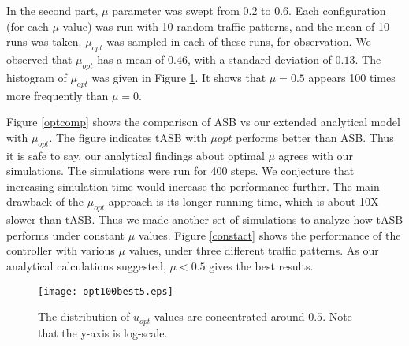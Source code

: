 \documentclass[conference]{IEEEtran}
\begin{document}
 
In the second part, $\mu$ parameter was swept from $0.2$ to $0.6$.
Each configuration (for each $\mu$ value) was run with 10 random traffic patterns, and  the mean of 10 runs was taken. 
 $\mu_{opt}$ was sampled in each of these runs, for observation. 
We observed that $\mu_{opt}$ has a mean of $0.46$, with a standard deviation of $0.13$. 
The histogram of  $\mu_{opt}$ was given in Figure \ref{opthist}. 
It shows that $\mu=0.5$ appears 100 times more frequently than $\mu=0$.


Figure \ref{optcomp} shows the comparison of ASB vs our extended analytical model with $\mu_{opt}$.
The figure indicates tASB with $\mu{opt}$ performs better than ASB.
Thus it is safe to say, our analytical findings about optimal $\mu$ agrees with our simulations.
The simulations were run for 400 steps. We conjecture that increasing simulation time would  increase the performance further.
The main drawback of the $\mu_{opt}$ approach is its longer running time, which is about 10X slower than  tASB.
Thus we made another set of simulations to analyze how tASB performs under constant $\mu$ values.
  Figure \ref{constact} shows the performance of the controller with various $\mu$ values, under 
three different traffic patterns. As our analytical calculations suggested, $\mu < 0.5$ gives the best results. 

 \begin{figure}[hb] 
 \centering
   \texttt{[image: opt100best5.eps]}
\caption{The distribution of $u_{opt}$ values are concentrated around $0.5$.
 Note that the y-axis is log-scale.
 }
\label{opthist}
\end{figure}
\end{document}
